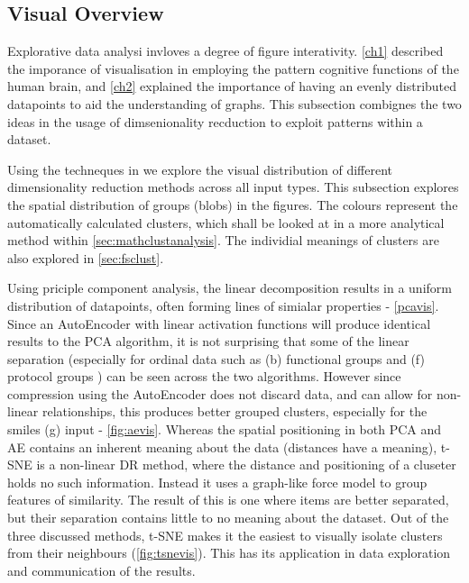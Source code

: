 % 

\subsection{Visual Overview}\label{sec:cldist}
Explorative data analysi invloves a degree of figure interativity. \autoref{ch1} described the imporance of visualisation in employing the pattern cognitive functions of the human brain, and \autoref{ch2} explained the importance of having an evenly distributed datapoints to aid the understanding of graphs. This subsection combignes the two ideas in the usage of dimsenionality recduction to exploit patterns within a dataset. 

Using the techneques in \label{sec:drvis} we explore the visual distribution of different dimensionality reduction methods across all input types. This subsection explores the spatial distribution of groups (blobs) in the figures. The colours represent the automatically calculated clusters, which shall be looked at in a more analytical method within \autoref{sec:mathclustanalysis}. The individial meanings of clusters are also explored in \autoref{sec:fsclust}.

Using priciple component analysis, the linear decomposition results in a uniform distribution of datapoints, often forming lines of simialar properties - \autoref{pcavis}. Since an AutoEncoder with linear activation functions will produce identical results to the PCA algorithm, it is not surprising that some of the linear separation (especially for ordinal data such as (b) functional groups and (f) protocol groups ) can be seen across the two algorithms. However since compression using the AutoEncoder does not discard data, and can allow for non-linear relationships, this produces better grouped clusters, especially for the smiles (g) input - \autoref{fig:aevis}. Whereas the spatial positioning in both PCA and AE contains an inherent meaning about the data (distances have a meaning), t-SNE is a non-linear DR method, where the distance and positioning of a cluseter holds no such information. Instead it uses a graph-like force model to group features of similarity. The result of this is one where items are better separated, but their separation contains little to no meaning about the dataset. Out of the three discussed methods, t-SNE makes it the easiest to visually isolate clusters from their neighbours (\autoref{fig:tsnevis}). This has its application in data exploration and communication of the results. 



